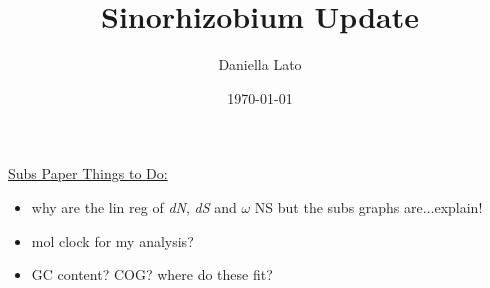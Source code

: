 \documentclass[12pt]{article}
\title{Sinorhizobium Update}
\author{Daniella Lato}
\date{\today}
\newcommand{\ecol}{\textit{E.\,coli}\xspace}
\newcommand{\dn}{\textit{dN}\xspace}
\newcommand{\ds}{\textit{dS}\xspace}
\begin{document}
	
	
	
	
	
	
%	
%	
%	
%	
%	
%	
%	
%	
%	
%
%
%	
%	
%	
%	
%
%	
%	
%	

\underline{Subs Paper Things to Do:}
\begin{itemize}


%    
%    
	\item why are the lin reg of \dn, \ds and $\omega$ NS but the subs graphs are...explain!

	\item mol clock for my analysis?
	
	\item GC content? COG? where do these fit?
	
\end{itemize}
\end{document}
